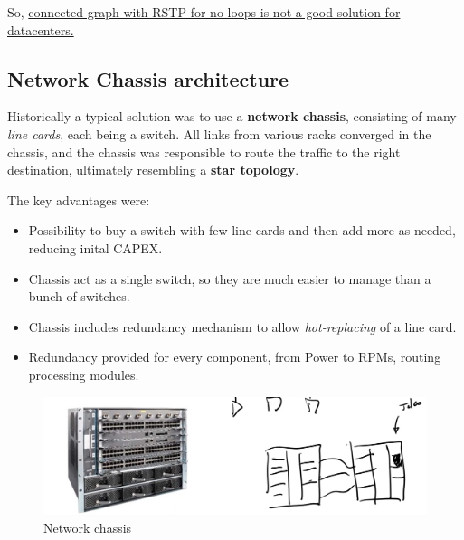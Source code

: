 \begin{center}
   So, \ul{connected graph with RSTP for no loops is not a good solution for datacenters.} \xmark
\end{center}
   
\subsection{Network Chassis architecture}

\begin{paracol}{2}
   
   Historically a typical solution was to use a \textbf{network chassis}, consisting of many \textit{line cards}, each being a switch.
   All links from various racks converged in the chassis, and the chassis was responsible to route the traffic to the right destination, ultimately resembling a \textbf{star topology}.
   
   {The key advantages were:\ns
   \begin{itemize}
      \item Possibility to buy a switch with few line cards and then add more as needed, reducing inital CAPEX.
      \item Chassis act as a single switch, so they are much easier to manage than a bunch of switches. 
      \item Chassis includes redundancy mechanism to allow \textit{hot-replacing} of a line card.
      \item Redundancy provided for every component, from Power to RPMs, routing processing modules.
   \end{itemize}}
   
   \switchcolumn
   
   \begin{figure}[htbp]
      \centering
      \includegraphics{images/network_chassis.png}
      \caption{Network chassis}
      \label{fig:network_chassis}
   \end{figure}

\end{paracol}
   
